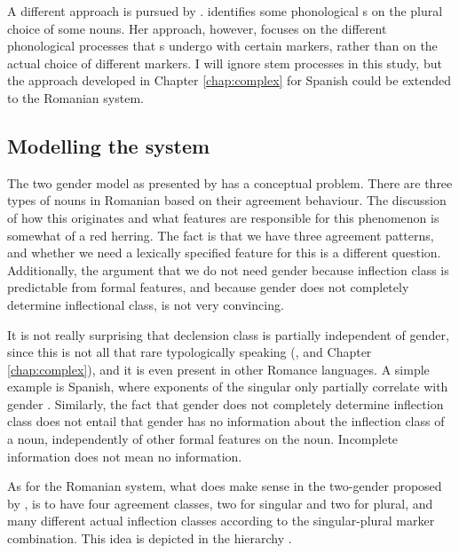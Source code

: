 A different approach is pursued by \textcite{Steriade.2008}. \citeauthor{Steriade.2008} identifies some phonological s on the plural choice of some nouns. Her approach, however, focuses on the different phonological processes that s undergo with certain markers, rather than on the actual choice of different markers. I will ignore stem processes in this study, but the approach developed in Chapter \ref{chap:complex} for Spanish could be extended to the Romanian system.


\subsection{Modelling the system}

The two gender model as presented by \textcite{Bateman.2010} has a conceptual problem. There are three types of nouns in Romanian based on their agreement behaviour. The discussion of how this originates and what features are responsible for this phenomenon is somewhat of a red herring. The fact is that we have three agreement patterns, and whether we need a lexically specified feature for this is a different question. Additionally, the argument that we do not need gender because inflection class is predictable from formal features, and because gender does not completely determine inflectional class, is not very convincing.

It is not really surprising that declension class is partially independent of gender, since this is not all that rare typologically speaking (\cite{Corbett.1991}, and Chapter \ref{chap:complex}), and it is even present in other Romance languages. A simple example is Spanish, where exponents of the singular only partially correlate with gender \autocite{Harris.1991}. Similarly, the fact that gender does not completely determine inflection class does not entail that gender has no information about the inflection class of a noun, independently of other formal features on the noun. Incomplete information does not mean no information.

As for the Romanian system, what does make sense in the two-gender proposed by \textcite{Bateman.2010}, is to have four agreement classes, two for singular and two for plural, and many different actual inflection classes according to the singular-plural marker combination. This idea is depicted in the hierarchy .

